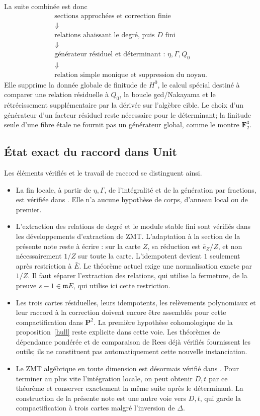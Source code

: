 \documentclass[11pt]{amsart}
\newcommand{\m}{\mathfrak m}
\begin{document}
La suite combinée est donc
\[
\begin{gathered}
\text{sections approchées et correction finie}\\
\Downarrow\\
\text{relations abaissant le degré, puis }D\text{ fini}\\
\Downarrow\\
\text{générateur résiduel et déterminant : }\eta,\Gamma,Q_0\\
\Downarrow\\
\text{relation simple monique et suppression du noyau.}
\end{gathered}
\]
Elle supprime la donnée globale de finitude de $H^0$, le calcul spécial
destiné à comparer une relation résiduelle à $Q_0$, la boucle
gcd/Nakayama et le rétrécissement supplémentaire par la dérivée sur
l'algèbre cible. Le choix d'un générateur d'un facteur résiduel reste
nécessaire pour le déterminant; la finitude seule d'une fibre étale
ne fournit pas un générateur global, comme le montre
$\mathbf F_2^3$.

\subsection{État exact du raccord dans Unit}

Les éléments vérifiés et le travail de raccord se distinguent ainsi.
\begin{itemize}
\item La fin locale, à partir de $\eta,\Gamma$, de l'intégralité et de
la génération par fractions, est vérifiée dans
. Elle n'a aucune
hypothèse de corps, d'anneau local ou de premier.
\item L'extraction des relations de degré et le module stable fini
sont vérifiés dans les développements d'extraction de ZMT. L'adaptation
à la section de la présente note reste à écrire : sur la carte $Z$,
sa réduction est $\bar e_Z/Z$, et non nécessairement $1/Z$ sur toute
la carte. L'idempotent devient $1$ seulement après restriction à
$\bar E$. Le théorème actuel
 exige une normalisation exacte par
$1/Z$. Il faut séparer l'extraction des relations, qui utilise la
fermeture, de la preuve $s-1\in\m E$, qui utilise ici cette restriction.
\item Les trois cartes résiduelles, leurs idempotents, les relèvements
polynomiaux et leur raccord à la correction doivent encore être
assemblés pour cette compactification dans $\mathbf P^2$. La première
hypothèse cohomologique de la proposition~\ref{hull} reste explicite
dans cette voie. Les théorèmes de dépendance pondérée et de comparaison
de Rees déjà vérifiés fournissent les outils; ils ne constituent pas
automatiquement cette nouvelle instanciation.
\item Le ZMT algébrique en toute dimension est désormais vérifié dans
. Pour terminer au plus vite l'intégration locale,
on peut obtenir $D,t$ par ce théorème et conserver exactement la même
suite après le déterminant. La construction de la présente note est
une autre voie vers $D,t$, qui garde la compactification à trois cartes
malgré l'inversion de $\Delta$.
\end{itemize}
\end{document}
